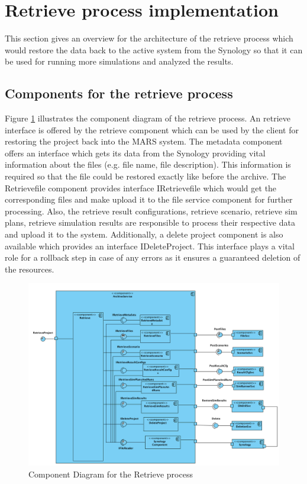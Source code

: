 \section{Retrieve process implementation}
This section gives an overview for the architecture of the retrieve process which would restore the data back to the active
system from the Synology so that it can be used for running more simulations and analyzed the results.

\subsection{Components for the retrieve process}
 Figure \ref{fig:restore} illustrates the component diagram of the retrieve process. An retrieve interface is offered by the retrieve component which can be used by
 the client for restoring the project back into the MARS system. The metadata component offers an interface which gets its data from the Synology 
 providing vital information about the files (e.g. file name, file description). This information is required so that the file could be restored exactly like before the
 archive. The Retrievefile component provides interface IRetrievefile which would get the corresponding files and make upload it to the file service component for further
processing. Also, the retrieve result configurations, retrieve scenario, retrieve sim plans, retrieve simulation results are responsible to process their respective data and upload 
it to the system. Additionally, a delete project component is also available which provides an interface IDeleteProject. This interface plays a vital role for a rollback step
in case of any errors as it ensures a guaranteed deletion of the resources.

\begin{figure}[H]
    \centering \includegraphics[scale=0.46]{grafiken/restoreComponent.png}
    \caption{Component Diagram for the Retrieve process}
    \label{fig:restore}
\end{figure}

